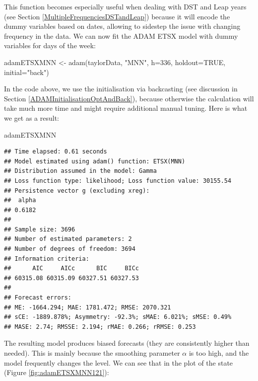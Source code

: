 \documentclass[
]{book}
\newenvironment{Shaded}{\begin{snugshade}}{\end{snugshade}}
\newcommand{\AttributeTok}[1]{\textcolor[rgb]{0.77,0.63,0.00}{#1}}
\newcommand{\ConstantTok}[1]{\textcolor[rgb]{0.00,0.00,0.00}{#1}}
\newcommand{\DecValTok}[1]{\textcolor[rgb]{0.00,0.00,0.81}{#1}}
\newcommand{\FunctionTok}[1]{\textcolor[rgb]{0.00,0.00,0.00}{#1}}
\newcommand{\NormalTok}[1]{#1}
\newcommand{\OtherTok}[1]{\textcolor[rgb]{0.56,0.35,0.01}{#1}}
\newcommand{\StringTok}[1]{\textcolor[rgb]{0.31,0.60,0.02}{#1}}
\theoremstyle{definition}
\theoremstyle{definition}
\theoremstyle{definition}
\theoremstyle{definition}
\theoremstyle{remark}
\begin{document}
This function becomes especially useful when dealing with DST and Leap years (see Section \ref{MultipleFrequenciesDSTandLeap}) because it will encode the dummy variables based on dates, allowing to sidestep the issue with changing frequency in the data. We can now fit the ADAM ETSX model with dummy variables for days of the week:

\begin{Shaded}
\begin{Highlighting}[]
\NormalTok{adamETSXMNN }\OtherTok{\textless{}{-}} \FunctionTok{adam}\NormalTok{(taylorData, }\StringTok{"MNN"}\NormalTok{, }\AttributeTok{h=}\DecValTok{336}\NormalTok{, }\AttributeTok{holdout=}\ConstantTok{TRUE}\NormalTok{,}
                    \AttributeTok{initial=}\StringTok{"back"}\NormalTok{)}
\end{Highlighting}
\end{Shaded}

In the code above, we use the initialisation via backcasting (see discussion in Section \ref{ADAMInitialisationOptAndBack}), because otherwise the calculation will take much more time and might require additional manual tuning. Here is what we get as a result:

\begin{Shaded}
\begin{Highlighting}[]
\NormalTok{adamETSXMNN}
\end{Highlighting}
\end{Shaded}

\begin{verbatim}
## Time elapsed: 0.61 seconds
## Model estimated using adam() function: ETSX(MNN)
## Distribution assumed in the model: Gamma
## Loss function type: likelihood; Loss function value: 30155.54
## Persistence vector g (excluding xreg):
##  alpha 
## 0.6182 
## 
## Sample size: 3696
## Number of estimated parameters: 2
## Number of degrees of freedom: 3694
## Information criteria:
##      AIC     AICc      BIC     BICc 
## 60315.08 60315.09 60327.51 60327.53 
## 
## Forecast errors:
## ME: -1664.294; MAE: 1781.472; RMSE: 2070.321
## sCE: -1889.878%; Asymmetry: -92.3%; sMAE: 6.021%; sMSE: 0.49%
## MASE: 2.74; RMSSE: 2.194; rMAE: 0.266; rRMSE: 0.253
\end{verbatim}

The resulting model produces biased forecasts (they are consistently higher than needed). This is mainly because the smoothing parameter \(\alpha\) is too high, and the model frequently changes the level. We can see that in the plot of the state (Figure \ref{fig:adamETSXMNN121}):
\end{document}
